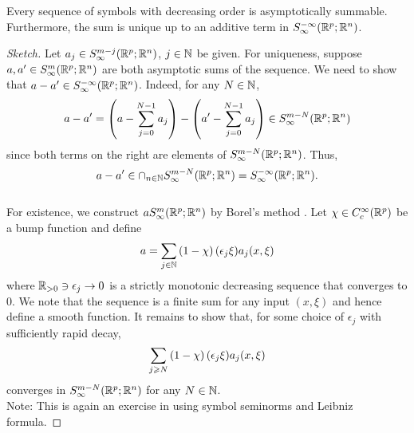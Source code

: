 \documentclass{article}
\begin{document}
\begin{flemma}
    Every sequence of symbols with decreasing order is asymptotically summable.  Furthermore, the sum is unique up to an additive term in $S^{-\infty}_\infty({\mathbb R}^{p}; {\mathbb R}^n)$. 
\end{flemma}
\begin{proof}[Sketch]
    Let $a_j \in S^{m-j}_\infty({\mathbb R}^{p}; {\mathbb R}^n)$, $j \in {\ensuremath {\mathbb N}}$ be given. For uniqueness, suppose $a, a' \in S^{m}_\infty({\mathbb R}^{p}; {\mathbb R}^n)$ are both asymptotic sums of the sequence. We need to show that $a - a' \in S^{-\infty}_\infty({\mathbb R}^{p}; {\mathbb R}^n)$. Indeed, for any $N \in {\ensuremath {\mathbb N}}$, 
    \begin{align*}
    a - a' = \left(a - \sum_{j = 0}^{N -1} a_j \right) - \left(a' - \sum_{j = 0}^{N -1} a_j \right) \in S^{m -N}_\infty({\mathbb R}^{p}; {\mathbb R}^n)
    \end{align*}
    since both terms on the right are elements of $S^{m -N}_\infty({\mathbb R}^{p}; {\mathbb R}^n)$. Thus, 
    $$a - a' \in \cap_{n \in {\ensuremath {\mathbb N}}} S^{m -N}_\infty({\mathbb R}^{p}; {\mathbb R}^n) = S^{-\infty}_\infty({\mathbb R}^{p}; {\mathbb R}^n).$$ 
    \\
    For existence, we construct $a S^{m}_\infty({\mathbb R}^{p}; {\mathbb R}^n)$ by Borel's method \cite{}. Let $\chi \in C^{\infty}_c({\mathbb R}^p)$ be a bump function and define
    \begin{align*}
    a = \sum_{j \in {\ensuremath {\mathbb N}}} \left(1 - \chi\right)(\epsilon_j \xi) a_j(x, \xi)
    \end{align*}
    where ${\mathbb R}_{> 0} \ni \epsilon_j \to 0 $ is a strictly monotonic decreasing sequence that converges to $0$. We note that the sequence is a finite sum for any input $(x, \xi)$ and hence define a smooth function. It remains to show that, for some choice of $\epsilon_j$ with sufficiently rapid decay, 
    \begin{align*}
    \sum_{j \geqslant N} \left(1 - \chi\right)(\epsilon_j \xi) a_j(x, \xi) 
    \end{align*}
    converges in $S^{m -N}_\infty({\mathbb R}^{p}; {\mathbb R}^n)$ for any $N \in {\ensuremath {\mathbb N}}$. 
    \\
    
    Note: This is again an exercise in using symbol seminorms and Leibniz formula.  
\end{proof}
\end{document}
